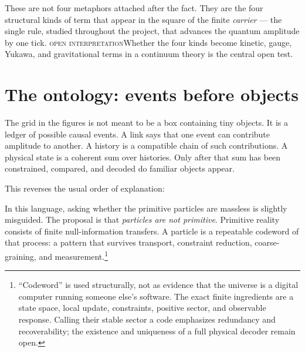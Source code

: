 \documentclass[11pt]{article}
\newcommand{\Clabel}{\textcolor{gold!80!black}{\textsc{open interpretation}}}
\begin{document}
These are not four metaphors attached after the fact.  They are the four
structural kinds of term that appear in the square of the finite
\emph{carrier} --- the single rule, studied throughout the project, that
advances the quantum amplitude by one tick.  \Clabel\quad Whether the four
kinds become kinetic, gauge, Yukawa, and gravitational terms in a continuum
theory is the central open test.

\section{The ontology: events before objects}
\label{sec:ontology}

The grid in the figures is not meant to be a box containing tiny objects.  It
is a ledger of possible causal events.  A link says that one event can
contribute amplitude to another.  A history is a compatible chain of such
contributions.  A physical state is a coherent sum over histories.  Only after
that sum has been constrained, compared, and decoded do familiar objects
appear.

This reverses the usual order of explanation:

\begin{center}
\end{center}

In this language, asking whether the primitive particles are massless is
slightly misguided.  The proposal is that \emph{particles are not primitive}.
Primitive reality consists of finite null-information transfers.  A particle
is a repeatable codeword of that process: a pattern that survives transport,
constraint reduction, coarse-graining, and measurement.\footnote{``Codeword''
is used structurally, not as evidence that the universe is a digital computer
running someone else's software.  The exact finite ingredients are a state
space, local update, constraints, positive sector, and observable response.
Calling their stable sector a code emphasizes redundancy and recoverability;
the existence and uniqueness of a full physical decoder remain open.}
\end{document}
